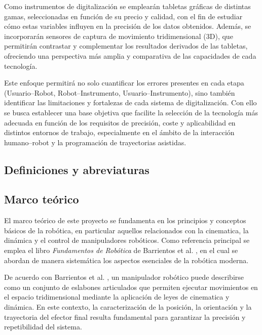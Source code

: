 \documentclass[12pt,a4paper,oneside]{report}
\begin{document}
Como instrumentos de digitalización se emplearán tabletas gráficas de 
distintas gamas, seleccionadas en función de su precio y calidad, 
con el fin de estudiar cómo estas variables influyen en la precisión 
de los datos obtenidos. Además, se incorporarán sensores de captura 
de movimiento tridimensional (3D), que permitirán contrastar y 
complementar los resultados derivados de las tabletas, ofreciendo 
una perspectiva más amplia y comparativa de las capacidades de cada 
tecnología.

Este enfoque permitirá no solo cuantificar los errores presentes en cada etapa
(Usuario–Robot, Robot–Instrumento, Usuario–Instrumento),
sino también identificar las limitaciones y fortalezas de
cada sistema de digitalización. Con ello se busca establecer
una base objetiva que facilite la selección de la tecnología
más adecuada en función de los requisitos de precisión, coste
y aplicabilidad en distintos entornos de trabajo, especialmente
en el ámbito de la interacción humano–robot y la programación de
trayectorias asistidas.

\subsection{Definiciones y abreviaturas}
\printnoidxglossary[title={Definiciones}]
\printnoidxglossary[type=\acronymtype,title={Acrónimos}]

\subsection{Marco teórico}


El marco teórico de este proyecto se fundamenta en los principios y conceptos
básicos de la robótica, en particular aquellos relacionados con la \gls{cinematica},
la dinámica y el control de manipuladores robóticos. Como referencia principal
se emplea el libro \textit{Fundamentos de Robótica} de Barrientos et al.
\cite{barrientos2014}, en el cual se abordan de manera sistemática los
aspectos esenciales de la robótica moderna.

De acuerdo con Barrientos et al. \cite{barrientos2014}, un manipulador robótico
puede describirse como un conjunto de eslabones articulados que permiten
ejecutar movimientos en el espacio tridimensional mediante la aplicación de
leyes de \gls{cinematica} y dinámica. En este contexto, la caracterización de la
posición, la orientación y la trayectoria del efector final resulta
fundamental para garantizar la precisión y repetibilidad del sistema.
\end{document}
